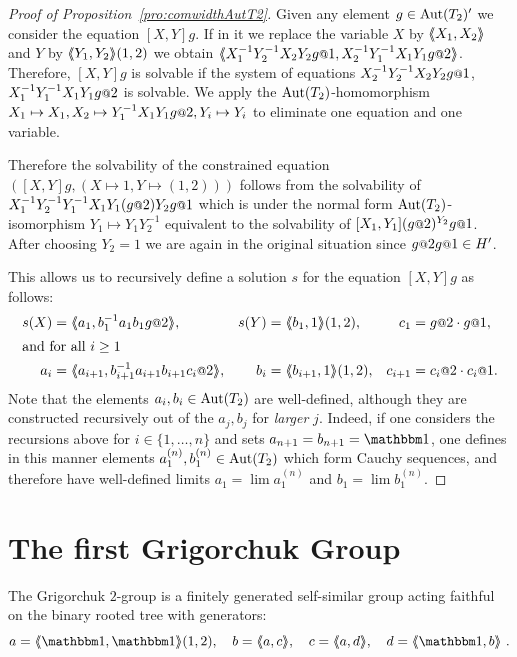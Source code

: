 \documentclass[a4paper,11pt]{amsart}
\begin{document}
\begin{proof}[Proof of Proposition~\ref{pro:comwidthAutT2}]
 Given any element $g\in \operatorname{{Aut}}(T_2)'$ we consider the equation $[X,Y]g$. 
 If in it we replace the variable $X$ by $\langle\negthickspace\langle X_1,X_2\rangle\negthickspace\rangle$ and $Y$ by $\langle\negthickspace\langle Y_1,Y_2\rangle\negthickspace\rangle(1,2)$ 
 we obtain $\pair{X_1^{-1}Y_2^{-1}X_2Y_2g\at{1},X_2^{-1}Y_1^{-1}X_1Y_1g\at{2}}$. 
 Therefore, $[X,Y]g$ is solvable if the system of equations
 $X_2^{-1}Y_2^{-1}X_2Y_2g\at{1}$, $X_1^{-1}Y_1^{-1}X_1Y_1g\at{2}$ is solvable.
 We apply the $\operatorname{{Aut}}(T_2)$-homomorphism $X_1\mapsto X_1,X_2\mapsto Y_1^{-1}X_1Y_1 g\at{2},Y_i\mapsto Y_i$ 
 to eliminate one equation and one variable.
 
 Therefore the solvability of the constrained equation
 $\left([X,Y]g, (X\mapsto 1,Y\mapsto (1,2)) \right)$ follows from the solvability of
 $X_1^{-1}Y_2^{-1}Y_1^{-1}X_1Y_1(g\at{2}) Y_2 g\at{1}$ which is under the 
 normal form $\operatorname{{Aut}}(T_2)$-isomorphism $Y_1\mapsto Y_1Y_2^{-1}$ equivalent to the 
 solvability of $[X_1,Y_1](g\at{2})^{Y_2} g\at{1}$. After choosing $Y_2=1$ we are 
 again in the original situation since $g\at{2} g\at{1}\in H'$. 
 
 This allows us to recursively define a solution $s$ for the equation $[X,Y]g$ as follows:
\begin{align*}
  s(X) &= \pair{a_1,b_1^{-1}a_1b_1 g\at{2} },
& s(Y) &= \pair{b_1,1}(1,2), &c_1&=g\at{2} \cdot g\at{1}, \\
\intertext{and for all $i\geq 1$}
  a_{i} &= \pair{a_{i+1},b_{i+1}^{-1}a_{i+1}b_{i+1} c_i\at{2} }, & b_{i} &=\pair{b_{i+1},1}(1,2),&c_{i+1}&=c_{i}\at{2} \cdot c_{i}\at{1}. 
 \end{align*}
 Note that the elements $a_i,b_i\in\operatorname{{Aut}}(T_2)$ are well-defined,
 although they are constructed recursively out of the $a_j,b_j$ for
 \emph{larger} $j$. Indeed, if one considers the recursions above for
 $i\in\{1,\dots,n\}$ and sets $a_{n+1}=b_{n+1}=\id$, one defines in
 this manner elements $a_1^{(n)},b_1^{(n)}\in\operatorname{{Aut}}(T_2)$ which form
 Cauchy sequences, and therefore have well-defined limits
 $a_1=\lim a_1^{(n)}$ and $b_1=\lim b_1^{(n)}$.
\end{proof}

\section{The first Grigorchuk Group}\label{sec:GrigorchukGroup}
The Grigorchuk $2$-group is a finitely generated self-similar group acting faithful
on the binary rooted tree with generators:
\[a=\pair{\id,\id}(1,2),\quad b=\pair{a,c},\quad c=\pair{a,d},\quad d=\pair{\id,b}\ . \]
\end{document}

